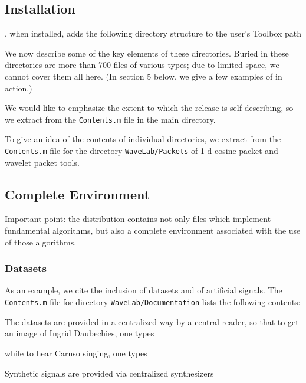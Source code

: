 \subsection{Installation}

\WaveLab, when installed, adds the following directory structure
to the user's Toolbox path



We now describe some of the key elements of these directories.
Buried in these directories are more than 700 files of various
types; due to limited space, we cannot cover them all here.
(In section 5 below, we give a few examples of \WaveLab in action.)

We would like to emphasize the extent to which the release
is self-describing, so we extract from the {\tt Contents.m} file
in the \TTWL main directory.


To give an idea of the contents of individual directories,
we extract from the {\tt Contents.m} file for the directory
{\tt WaveLab/Packets} of 1-d cosine packet and wavelet packet tools.




\subsection{Complete Environment}

Important point: the \WaveLab distribution
contains not only \dotm files which implement 
fundamental algorithms,
but also a complete environment associated with
the use of those algorithms.

\subsubsection{Datasets}
As an example, we cite the inclusion of datasets
and of artificial signals. The {\tt Contents.m}
file for directory {\tt WaveLab/Documentation}
lists the following contents:


The datasets are provided in a centralized way
by a central reader, so that to get an
image of Ingrid Daubechies, one types


while to hear Caruso singing,
one types


Synthetic signals are provided via
centralized synthesizers

